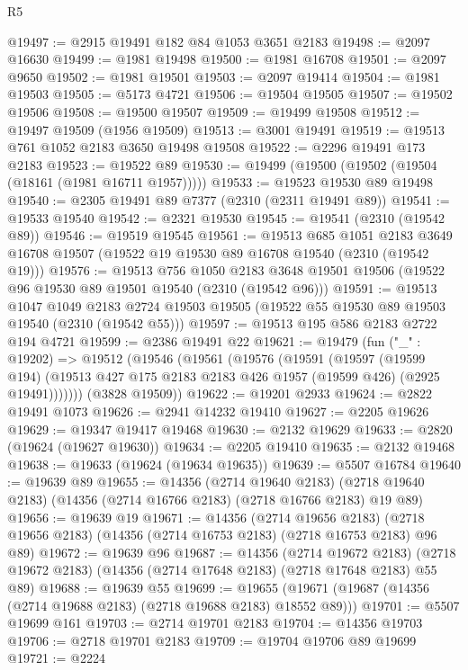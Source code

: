 \begin{lexlean}{R5}
\begin{coremodule}
@19497 := @2915 @19491 @182 @84 @1053 @3651 @2183
@19498 := @2097 @16630
@19499 := @1981 @19498
@19500 := @1981 @16708
@19501 := @2097 @9650
@19502 := @1981 @19501
@19503 := @2097 @19414
@19504 := @1981 @19503
@19505 := @5173 @4721
@19506 := @19504 @19505
@19507 := @19502 @19506
@19508 := @19500 @19507
@19509 := @19499 @19508
@19512 := @19497 @19509 (@1956 @19509)
@19513 := @3001 @19491
@19519 := @19513 @761 @1052 @2183 @3650 @19498 @19508
@19522 := @2296 @19491 @173 @2183
@19523 := @19522 @89
@19530 := @19499 (@19500 (@19502 (@19504 (@18161 (@1981 @16711 @1957)))))
@19533 := @19523 @19530 @89 @19498
@19540 := @2305 @19491 @89 @7377 (@2310 (@2311 @19491 @89))
@19541 := @19533 @19540
@19542 := @2321 @19530
@19545 := @19541 (@2310 (@19542 @89))
@19546 := @19519 @19545
@19561 := @19513
    @685
    @1051
    @2183
    @3649
    @16708
    @19507
    (@19522 @19 @19530 @89 @16708 @19540 (@2310 (@19542 @19)))
@19576 := @19513
    @756
    @1050
    @2183
    @3648
    @19501
    @19506
    (@19522 @96 @19530 @89 @19501 @19540 (@2310 (@19542 @96)))
@19591 := @19513
    @1047
    @1049
    @2183
    @2724
    @19503
    @19505
    (@19522 @55 @19530 @89 @19503 @19540 (@2310 (@19542 @55)))
@19597 := @19513 @195 @586 @2183 @2722 @194 @4721
@19599 := @2386 @19491 @22
@19621 := @19479
    (fun ("_" : @19202) =>
    @19512
      (@19546
        (@19561
          (@19576
            (@19591
              (@19597
                (@19599 @194)
                (@19513 @427 @175 @2183 @2183 @426 @1957 (@19599 @426) (@2925 @19491)))))))
      (@3828 @19509))
@19622 := @19201 @2933
@19624 := @2822 @19491 @1073
@19626 := @2941 @14232 @19410
@19627 := @2205 @19626
@19629 := @19347 @19417 @19468
@19630 := @2132 @19629
@19633 := @2820 (@19624 (@19627 @19630))
@19634 := @2205 @19410
@19635 := @2132 @19468
@19638 := @19633 (@19624 (@19634 @19635))
@19639 := @5507 @16784
@19640 := @19639 @89
@19655 := @14356
    (@2714 @19640 @2183)
    (@2718 @19640 @2183)
    (@14356 (@2714 @16766 @2183) (@2718 @16766 @2183) @19 @89)
@19656 := @19639 @19
@19671 := @14356
    (@2714 @19656 @2183)
    (@2718 @19656 @2183)
    (@14356 (@2714 @16753 @2183) (@2718 @16753 @2183) @96 @89)
@19672 := @19639 @96
@19687 := @14356
    (@2714 @19672 @2183)
    (@2718 @19672 @2183)
    (@14356 (@2714 @17648 @2183) (@2718 @17648 @2183) @55 @89)
@19688 := @19639 @55
@19699 := @19655 (@19671 (@19687 (@14356 (@2714 @19688 @2183) (@2718 @19688 @2183) @18552 @89)))
@19701 := @5507 @19699 @161
@19703 := @2714 @19701 @2183
@19704 := @14356 @19703
@19706 := @2718 @19701 @2183
@19709 := @19704 @19706 @89 @19699
@19721 := @2224

\end{coremodule}
\end{lexlean}
